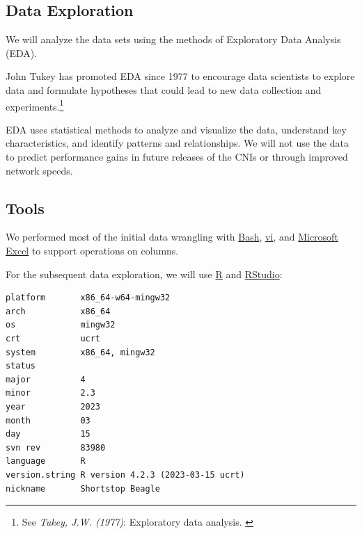 \subsection{Data Exploration}

We will analyze the data sets using the methods of Exploratory Data Analysis (EDA).

John Tukey has promoted EDA since 1977 to encourage data scientists to explore data and formulate hypotheses that could lead to new data collection and experiments.\footnote{See \textit{Tukey, J.W. (1977)}: Exploratory data analysis. \cite{exploratoryDA}}

EDA uses statistical methods to analyze and visualize the data, understand key characteristics, and identify patterns and relationships. We will not use the data to predict performance gains in future releases of the CNIs or through improved network speeds.

\subsection{Tools}

We performed most of the initial data wrangling with \href{https://www.gnu.org/software/bash/}{Bash}, \href{https://pubs.opengroup.org/onlinepubs/9699919799/utilities/vi.html}{vi}, and \href{https://www.microsoft.com/en-us/microsoft-365/excel}{Microsoft Excel} to support operations on columns.

For the subsequent data exploration, we will use \href{https://www.r-project.org/}{R} and \href{https://posit.co/download/rstudio-desktop/}{RStudio}:

\begin{Shaded}
\begin{Highlighting}[]
\end{Highlighting}
\end{Shaded}

\begin{verbatim}
platform       x86_64-w64-mingw32               
arch           x86_64                           
os             mingw32                          
crt            ucrt                             
system         x86_64, mingw32                  
status                                          
major          4                                
minor          2.3                              
year           2023                             
month          03                               
day            15                               
svn rev        83980                            
language       R                                
version.string R version 4.2.3 (2023-03-15 ucrt)
nickname       Shortstop Beagle                 
\end{verbatim}
